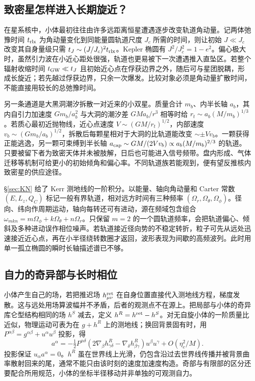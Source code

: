 \subsection{致密星怎样进入长期旋近？}

在星系核中，小体最初往往由许多远距离恒星遭遇逐步改变轨道角动量。记两体弛豫时间 $t_{\rm rlx}$ 为角动量变化到同能量圆轨道尺度 $J_c$ 所需的时间，则让初始 $J\ll J_c$ 改变其自身量级只需 $t_J\sim(J/J_c)^2t_{\rm rlx}$。Kepler 椭圆有 $J^2/J_c^2=1-e^2$。偏心极大时，虽然引力波在小近心距处很强，轨道也更易被下一次遭遇推入直坠区。若整个辐射收缩时间 $t_{\rm GW}\ll t_J$ 且初始近心点在俘获边界之外，随后可与星团脱耦，形成长旋近；若先越过俘获边界，只余一次爆发。比较对象必须是角动量扩散时间，不能直接用较长的总弛豫时间。

另一条通道是大黑洞潮汐拆散一对近来的小双星。质量合计 $m_b$、内半长轴 $a_b$，其内自引力加速度 $Gm_b/a_b^2$ 与大洞的潮汐差 $GMa_b/r^3$ 相等时给 $r_t\sim a_b(M/m_b)^{1/3}$。若质心最初近抛物线，近心点速度 $V\sim(GM/r_t)^{1/2}$，内部速度 $v_b\sim(Gm_b/a_b)^{1/2}$，拆散后每颗星相对于大洞的比轨道能改变 $\sim\pm Vv_b$。一颗获得正能逃逸，另一颗可束缚到半长轴 $a_{\rm cap}\sim GM/(2Vv_b)\propto a_b(M/m_b)^{2/3}$ 的轨道。只要被留下者为致密天体并未被肢解，日后也可能进入信号频带。盘内形成、气体迁移等机制可给更小的初始倾角和偏心率。不同轨道族若能观到，便有望反推核内致密星的供应途径。

\S\ref{sec:KN} 给了 Kerr 测地线的一阶积分。以能量、轴向角动量和 Carter 常数 $(E,L_z,Q_C)$ 标记一般有界轨道，相对远方时间有三种频率 $(\Omega_r,\Omega_\theta,\Omega_\phi)$。径向、纬向作周期运动，轴向每转还可有进动，源在频域包含组合 $\omega_{mkn}=m\Omega_\phi+k\Omega_\theta+n\Omega_r$。只保留 $m=2$ 的一个圆轨道频率，会把轨道偏心、倾斜及多种进动误作相位噪声。若轨道接近径向势的不稳定转折，粒子可先从远处迅速接近近心点，再在小半径绕转数圈才返回，波形表现为间歇的高频波列。此时用单一孤立椭圆的瞬时长轴描述谱已不够。

\subsection{自力的奇异部与长时相位}

小体产生自己的场，若把推迟场 $h_{\mu\nu}^{\rm ret}$ 在自身位置直接代入测地线方程，梯度发散。这与远处用场算波幅并不矛盾，后者的观测点不在源上。把局部与小体的奇异库仑型结构相同的场 $h^S$ 减去，定义 $h^R=h^{\rm ret}-h^S$。对无自旋小体的一阶质量比近似，物理运动可表为在 $g+h^R$ 上的测地线；换回背景固有时，用 $P^{\alpha\beta}=g^{\alpha\beta}+u^\alpha u^\beta$ 投影，得
\[
 a^\alpha=-\tfrac12 P^{\alpha\delta}
 (2\nabla_\beta h^R_{\gamma\delta}-\nabla_\delta h^R_{\beta\gamma})
 u^\beta u^\gamma+O(\eta_e^2/M).
\]
投影保证 $u_\alpha a^\alpha=0$。$h^R$ 虽在世界线上光滑，仍包含沿过去世界线传播并被背景曲率散射回来的尾，通常不能只由该时刻的速度加速度构造。奇部与有限部的区分还要配合所用规范，小体的坐标半径移动并非单独的可观测自力。

